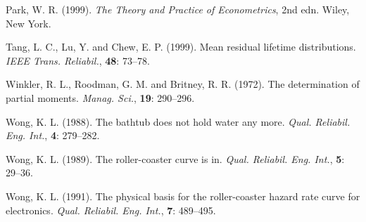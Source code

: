 \documentclass{ws-ijcm}
\begin{document}
\begin{thebibliography}
Park, W. R. (1999). {\it The Theory and Practice of
Econometrics}, 2nd edn. Wiley, New York.

Tang, L. C., Lu, Y. and Chew, E. P. (1999). Mean residual lifetime 
distributions. {\it IEEE Trans. Reliabil.}, {\bf 48}: 73--78.

Winkler, R. L., Roodman, G. M. and Britney, R. R. (1972). The 
determination of partial moments. {\it Manag. Sci.}, 
{\bf 19}: 290--296.

Wong, K. L. (1988). The bathtub does not hold water any more.  
{\it Qual. Reliabil. Eng. Int.}, {\bf 4}: 279--282.

Wong, K. L. (1989). The roller-coaster curve is in. 
{\it Qual. Reliabil. Eng. Int.}, {\bf 5}: 29--36.

Wong, K. L. (1991). The physical basis for the roller-coaster 
hazard rate curve for electronics. {\it Qual. Reliabil. 
Eng. Int.}, {\bf 7}: 489--495.
\end{thebibliography}
\end{document}
